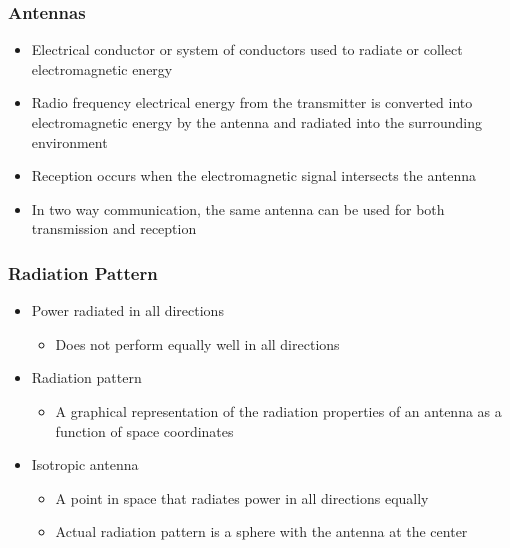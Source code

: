 \documentclass[pdflatex,compress]{beamer}
\begin{document}
\begin{frame}
	\frametitle{Antennas}
	\begin{itemize}
		\item Electrical conductor or system of conductors used to radiate or collect electromagnetic energy
		\item Radio frequency electrical energy from the transmitter is converted into electromagnetic energy by the antenna and radiated into the surrounding environment
		\item Reception occurs when the electromagnetic signal intersects the antenna
		\item In two way communication, the same antenna can be used for both transmission and reception
	\end{itemize}
\end{frame}

\begin{frame}
	\frametitle{Radiation Pattern}
	\begin{itemize}
		\item Power radiated in all directions
		\begin{itemize}
			\item Does not perform equally well in all directions
		\end{itemize}
		\item Radiation pattern
		\begin{itemize}
			\item A graphical representation of the radiation properties of an antenna as a function of space coordinates
		\end{itemize}
		\item Isotropic antenna
		\begin{itemize}
			\item A point in space that radiates power in all directions equally
			\item Actual radiation pattern is a sphere with the antenna at the center
		\end{itemize}
	\end{itemize}
\end{frame}
\end{document}

